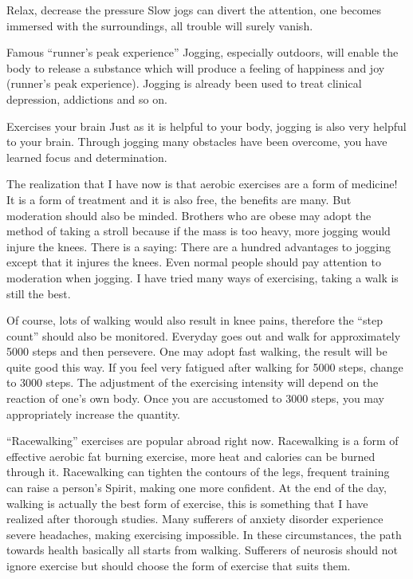 \documentclass[
]{book}
\begin{document}
Relax, decrease the pressure
Slow jogs can divert the attention, one becomes immersed with the surroundings, all trouble will surely vanish.

Famous ``runner's peak experience'' Jogging, especially outdoors, will enable the body to release a substance which will produce a feeling of happiness and joy (runner's peak experience). Jogging is already been used to treat clinical depression, addictions and so on.

Exercises your brain
Just as it is helpful to your body, jogging is also very helpful to your brain. Through jogging many obstacles have been overcome, you have learned focus and determination.

The realization that I have now is that aerobic exercises are a form of medicine! It is a form of treatment and it is also free, the benefits are many. But moderation should also be minded. Brothers who are obese may adopt the method of taking a stroll because if the mass is too heavy, more jogging would injure the knees. There is a saying: There are a hundred advantages to jogging except that it injures the knees. Even normal people should pay attention to moderation when jogging. I have tried many ways of exercising, taking a walk is still the best.

Of course, lots of walking would also result in knee pains, therefore the ``step count'' should also be monitored. Everyday goes out and walk for approximately 5000 steps and then persevere. One may adopt fast walking, the result will be quite good this way. If you feel very fatigued after walking for 5000 steps, change to 3000 steps. The adjustment of the exercising intensity will depend on the reaction of one's own body. Once you are accustomed to 3000 steps, you may appropriately increase the quantity.

``Racewalking'' exercises are popular abroad right now. Racewalking is a form of effective aerobic fat burning exercise, more heat and calories can be burned through it. Racewalking can tighten the contours of the legs, frequent training can raise a person's Spirit, making one more confident. At the end of the day, walking is actually the best form of exercise, this is something that I have realized after thorough studies. Many sufferers of anxiety disorder experience severe headaches, making exercising impossible. In these circumstances, the path towards health basically all starts from walking. Sufferers of neurosis should not ignore exercise but should choose the form of exercise that suits them.
\end{document}
